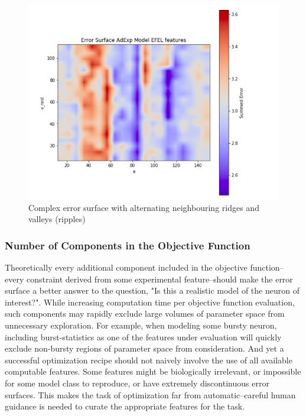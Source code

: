 \begin{figure}
    \centering
    \includegraphics[scale=1.25]{figures/third_error_surface.png}
        \caption[Complex but not hopeless error surfaces]{Complex error surface with alternating neighbouring ridges and valleys (ripples)}
    \label{fig:real_problem_nontrivial_surface}
\end{figure}





\subsubsection{Number of Components in the Objective Function}
Theoretically every additional component included in the objective function--every constraint derived from some experimental feature--should make the error surface a better answer to the question, "Is this a realistic model of the neuron of interest?".
While increasing computation time per objective function evaluation, such components may rapidly exclude large volumes of parameter space from unnecessary exploration.
For example, when modeling some bursty neuron, including burst-statistics as one of the features under evaluation will quickly exclude non-bursty regions of parameter space from consideration.
And yet a successful optimization recipe should not naively involve the use of all available computable features.
Some features might be biologically irrelevant, or impossible for some model class to reproduce, or have extremely discontinuous error surfaces.
This makes the task of optimization far from automatic--careful human guidance is needed to curate the appropriate features for the task. 


